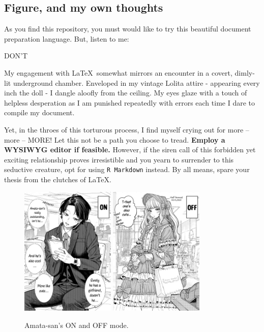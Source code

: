 \begin{spacing}{2}
    \subsection{Figure, and my own thoughts}
    \par
    As you find this repository, you must would like to try this beautiful document preparation language. But, listen to me: 
    \begin{center}
    	\large
    	DON'T
    \end{center}
    
    My engagement with \LaTeX \ somewhat mirrors an encounter in a covert, dimly-lit underground chamber. Enveloped in my vintage Lolita attire - appearing every inch the doll - I dangle aloofly from the ceiling. My eyes glaze with a touch of helpless desperation as I am punished repeatedly with errors each time I dare to compile my document.
    
    Yet, in the throes of this torturous process, I find myself crying out for more – more – MORE! Let this not be a path you choose to tread. \textbf{Employ a WYSIWYG editor if feasible.} However, if the siren call of this forbidden yet exciting relationship proves irresistible and you yearn to surrender to this seductive creature, opt for using \verb|R Markdown| instead. By all means, spare your thesis from the clutches of \LaTeX.
    
    
    \begin{figure}
    	\includegraphics[width=0.4\textwidth]{ch1/on-mode.jpg}
    	\includegraphics[width=0.4\textwidth]{ch1/off-mode.jpg}
    	\caption{Amata-san's ON and OFF mode. }
    \end{figure}


\end{spacing}

